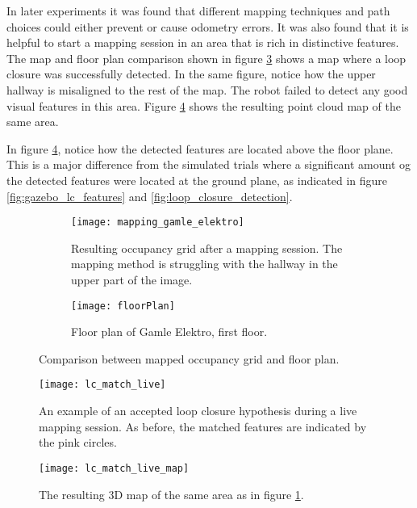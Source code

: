 In later experiments it was found that different mapping techniques and path choices could either prevent or cause odometry errors. It was also found that it is helpful to start a mapping session in an area that is rich in distinctive features. The map and floor plan comparison shown in figure \ref{fig:comparison} shows a map where a loop closure was successfully detected. In the same figure, notice how the upper hallway is misaligned to the rest of the map. The robot failed to detect any good visual features in this area. Figure \ref{fig:lc_match_live} shows the resulting point cloud map of the same area.

In figure \ref{fig:lc_match_live}, notice how the detected features are located above the floor plane. This is a major difference from the simulated trials where a significant amount og the detected features were located at the ground plane, as indicated in figure \ref{fig:gazebo_lc_features} and \ref{fig:loop_closure_detection}.

\begin{figure}
	\centering
	\begin{subfigure}[b]{1\textwidth}
		\texttt{[image: mapping\_gamle\_elektro]}
		\caption{Resulting occupancy grid after a mapping session. The mapping  method is struggling with the  hallway in the upper part of the image.}
		\label{fig:mapping_gamle_elektro}
	\end{subfigure}
	\begin{subfigure}[b]{1\textwidth}
		\texttt{[image: floorPlan]}
		\caption{Floor plan of Gamle Elektro, first floor.}
		\label{fig:floorPlan}
	\end{subfigure}
	\caption{Comparison between mapped occupancy grid and floor plan.}\label{fig:comparison}
\end{figure}



\begin{figure}[h]
	\centering
	\texttt{[image: lc\_match\_live]}
	\caption{An example of an accepted loop closure hypothesis during a live mapping session. As before, the matched features are indicated by the pink circles.}
	\label{fig:lc_match_live}
\end{figure}

\begin{figure}[h]
	\centering
	\texttt{[image: lc\_match\_live\_map]}
	\caption{The resulting 3D map of the same area as in figure \ref{fig:mapping_gamle_elektro}.}
	\label{fig:lc_match_live_map}
\end{figure}

